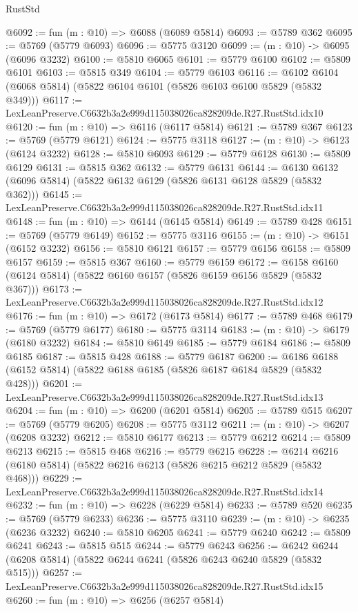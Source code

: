 \begin{lexlean}{RustStd}
\begin{coremodule}
@6092 := fun (m : @10) => @6088 (@6089 @5814)
@6093 := @5789 @362
@6095 := @5769 (@5779 @6093)
@6096 := @5775 @3120
@6099 := (m : @10) -> @6095 (@6096 @3232)
@6100 := @5810 @6065
@6101 := @5779 @6100
@6102 := @5809 @6101
@6103 := @5815 @349
@6104 := @5779 @6103
@6116 := @6102 @6104 (@6068 @5814) (@5822 @6104 @6101 (@5826 @6103 @6100 @5829 (@5832 @349)))
@6117 := LexLeanPreserve.C6632b3a2e999d115038026ca828209de.R27.RustStd.idx10
@6120 := fun (m : @10) => @6116 (@6117 @5814)
@6121 := @5789 @367
@6123 := @5769 (@5779 @6121)
@6124 := @5775 @3118
@6127 := (m : @10) -> @6123 (@6124 @3232)
@6128 := @5810 @6093
@6129 := @5779 @6128
@6130 := @5809 @6129
@6131 := @5815 @362
@6132 := @5779 @6131
@6144 := @6130 @6132 (@6096 @5814) (@5822 @6132 @6129 (@5826 @6131 @6128 @5829 (@5832 @362)))
@6145 := LexLeanPreserve.C6632b3a2e999d115038026ca828209de.R27.RustStd.idx11
@6148 := fun (m : @10) => @6144 (@6145 @5814)
@6149 := @5789 @428
@6151 := @5769 (@5779 @6149)
@6152 := @5775 @3116
@6155 := (m : @10) -> @6151 (@6152 @3232)
@6156 := @5810 @6121
@6157 := @5779 @6156
@6158 := @5809 @6157
@6159 := @5815 @367
@6160 := @5779 @6159
@6172 := @6158 @6160 (@6124 @5814) (@5822 @6160 @6157 (@5826 @6159 @6156 @5829 (@5832 @367)))
@6173 := LexLeanPreserve.C6632b3a2e999d115038026ca828209de.R27.RustStd.idx12
@6176 := fun (m : @10) => @6172 (@6173 @5814)
@6177 := @5789 @468
@6179 := @5769 (@5779 @6177)
@6180 := @5775 @3114
@6183 := (m : @10) -> @6179 (@6180 @3232)
@6184 := @5810 @6149
@6185 := @5779 @6184
@6186 := @5809 @6185
@6187 := @5815 @428
@6188 := @5779 @6187
@6200 := @6186 @6188 (@6152 @5814) (@5822 @6188 @6185 (@5826 @6187 @6184 @5829 (@5832 @428)))
@6201 := LexLeanPreserve.C6632b3a2e999d115038026ca828209de.R27.RustStd.idx13
@6204 := fun (m : @10) => @6200 (@6201 @5814)
@6205 := @5789 @515
@6207 := @5769 (@5779 @6205)
@6208 := @5775 @3112
@6211 := (m : @10) -> @6207 (@6208 @3232)
@6212 := @5810 @6177
@6213 := @5779 @6212
@6214 := @5809 @6213
@6215 := @5815 @468
@6216 := @5779 @6215
@6228 := @6214 @6216 (@6180 @5814) (@5822 @6216 @6213 (@5826 @6215 @6212 @5829 (@5832 @468)))
@6229 := LexLeanPreserve.C6632b3a2e999d115038026ca828209de.R27.RustStd.idx14
@6232 := fun (m : @10) => @6228 (@6229 @5814)
@6233 := @5789 @520
@6235 := @5769 (@5779 @6233)
@6236 := @5775 @3110
@6239 := (m : @10) -> @6235 (@6236 @3232)
@6240 := @5810 @6205
@6241 := @5779 @6240
@6242 := @5809 @6241
@6243 := @5815 @515
@6244 := @5779 @6243
@6256 := @6242 @6244 (@6208 @5814) (@5822 @6244 @6241 (@5826 @6243 @6240 @5829 (@5832 @515)))
@6257 := LexLeanPreserve.C6632b3a2e999d115038026ca828209de.R27.RustStd.idx15
@6260 := fun (m : @10) => @6256 (@6257 @5814)

\end{coremodule}
\end{lexlean}
